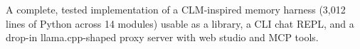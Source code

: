 \documentclass{article}
\begin{document}
\item A complete, tested implementation of a CLM-inspired memory harness (3{,}012 lines of Python across 14 modules) usable as a library, a CLI chat REPL, and a drop-in llama.cpp-shaped proxy server with web studio and MCP tools.
\end{document}
